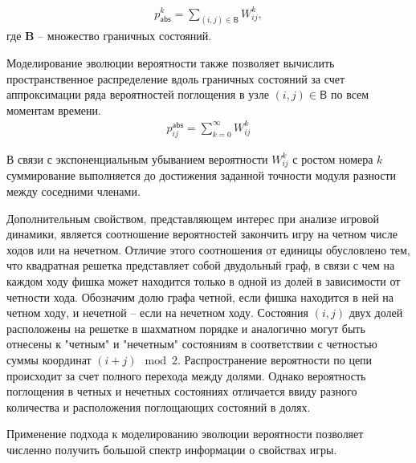 \begin{equation}
    \begin{aligned}
    p_\mathsf{abs}^{k}=\sum_{(i, j) \in \boldsymbol{\mathsf{B}}} W_{ij}^{k},
    \label{eq:timedistr}
    \end{aligned}
\end{equation}
где $\textbf{B}$ -- множество граничных состояний.

Моделирование эволюции вероятности также позволяет вычислить пространственное распределение вдоль граничных состояний за
счет аппроксимации ряда вероятностей поглощения в узле $(i, j) \in \boldsymbol{\mathsf{B}}$ по всем моментам времени.
\begin{equation}
    \begin{aligned}
    p_{ij}^\mathsf{abs}=\sum_{k=0}^{\infty} W_{ij}^{k}
    \label{eq:spacedistr}
    \end{aligned}
\end{equation}

В связи с экспоненциальным убыванием вероятности $W_{ij}^{k}$ с ростом номера $k$ суммирование выполняется до достижения заданной точности
модуля разности между соседними членами.

Дополнительным свойством, представляющем интерес при анализе игровой динамики, является соотношение вероятностей
закончить игру на четном числе ходов или на нечетном. Отличие этого соотношения от единицы обусловлено 
тем, что квадратная решетка представляет собой двудольный граф,
в связи с чем на каждом ходу фишка может находится только в одной из долей в зависимости от четности хода.
Обозначим долю графа четной, если фишка находится в ней на четном ходу, и нечетной -- если на нечетном ходу.
Состояния $(i, j)$ двух долей расположены на решетке в шахматном порядке и аналогично могут быть отнесены
к "четным" и "нечетным" состояниям в соответствии с четностью суммы координат $(i + j) \mod 2$.
Распространение вероятности по цепи происходит за счет полного перехода между долями. 
Однако вероятность поглощения в четных и нечетных состояниях отличается ввиду разного количества и расположения поглощающих состояний в долях.

Применение подхода к моделированию эволюции вероятности позволяет численно получить большой спектр информации о свойствах игры.


